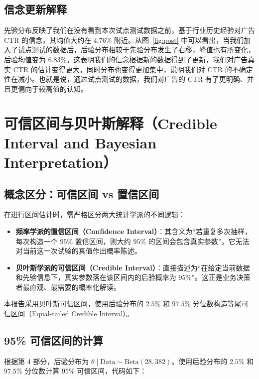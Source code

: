 \documentclass[12pt,a4paper,UTF8,fontset=none]{ctexart}
\newcommand{\tht}{\theta}
\begin{document}
\subsection{信念更新解释}

先验分布反映了我们在没有看到本次试点测试数据之前，基于行业历史经验对广告 CTR 的信念，其均值大约在 $4.76\%$ 附近。从图~\ref{fig:post} 中可以看出，当我们加入了试点测试的数据后，后验分布相较于先验分布发生了右移，峰值也有所变化，后验均值变为 $6.83\%$。这表明我们的信念根据新的数据得到了更新，我们对广告真实 CTR 的估计变得更大，同时分布也变得更加集中，说明我们对 CTR 的不确定性在减小。也就是说，通过试点测试的数据，我们对广告的 CTR 有了更明确、并且更偏向于较高值的认知。

\section{可信区间与贝叶斯解释（Credible Interval and Bayesian Interpretation）}

\subsection{概念区分：可信区间 vs 置信区间}

在进行区间估计时，需严格区分两大统计学派的不同逻辑：

\begin{itemize}
  \item \textbf{频率学派的置信区间（Confidence Interval）}：其含义为“若重复多次抽样，每次构造一个 $95\%$ 置信区间，则大约 $95\%$ 的区间会包含真实参数”。它无法对当前这一次试验的真值作出概率陈述。
  \item \textbf{贝叶斯学派的可信区间（Credible Interval）}：直接描述为“在给定当前数据和先验信息下，真实参数落在该区间内的后验概率为 $95\%$”。这正是业务决策者最直观、最需要的概率化解读。
\end{itemize}

本报告采用贝叶斯可信区间，使用后验分布的 $2.5\%$ 和 $97.5\%$ 分位数构造等尾可信区间（Equal-tailed Credible Interval）。

\subsection{95\% 可信区间的计算}

根据第 4 部分，后验分布为 $\tht\mid\text{Data}\sim\mathrm{Beta}(28,382)$。使用后验分布的 $2.5\%$ 和 $97.5\%$ 分位数计算 $95\%$ 可信区间，代码如下：
\end{document}
